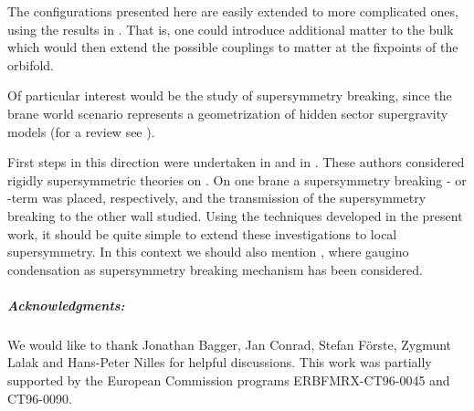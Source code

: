 \documentclass[a4paper,12pt, twoside]{article}
\numberwithin{equation}{section}
\begin{document}
The configurations presented here are easily extended to more 
complicated ones, using the results in \cite{Zucker:2000ej, Zucker:1999fn, 
diss}. That is, one could introduce additional matter to the bulk which 
would then extend the possible couplings to matter at the fixpoints of the 
orbifold.

Of particular interest would be the study of supersymmetry breaking, 
since the brane world scenario represents a geometrization of hidden 
sector supergravity models (for a review see \cite{Nilles:1984ge}). 

First steps in this direction were undertaken in 
\cite{Mirabelli:1998aj} and in \cite{gabi}. These authors considered rigidly supersymmetric 
theories on \coordHE{}. On one brane a supersymmetry breaking 
\coordHE{}- or \coordHE{}-term was placed, respectively, and the transmission of the 
supersymmetry breaking to the other wall studied. Using the techniques 
developed in the present work, it should be quite simple to extend these 
investigations to local supersymmetry. In this context we should also 
mention \cite{Falkowski:2000er}, where gaugino condensation as 
supersymmetry breaking mechanism has been considered.


\subparagraph{Acknowledgments:}
We would like to thank Jonathan Bagger, Jan Conrad, Stefan F\"orste, 
Zygmunt Lalak and Hans-Peter Nilles for helpful discussions.
This work was partially supported by the European Commission programs 
ERBFMRX-CT96-0045 and CT96-0090.
\end{document}
